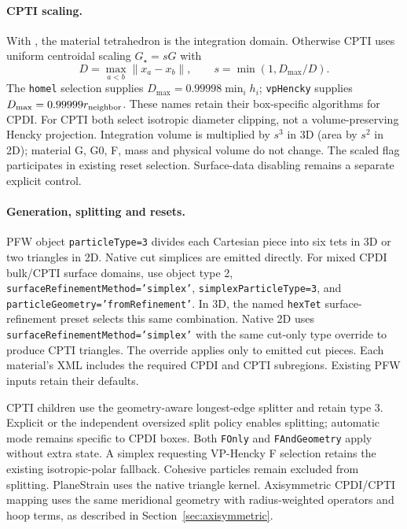 \paragraph{CPTI scaling.}
With , the material tetrahedron is the integration
domain. Otherwise CPTI uses uniform centroidal scaling $G_\star=sG$ with
\begin{equation}
 D=\max_{a<b}\|x_a-x_b\|,\qquad s=\min(1,D_{\max}/D).
\end{equation}
The \texttt{homel} selection supplies $D_{\max}=0.99998\min_i h_i$;
\texttt{vpHencky} supplies $D_{\max}=0.99999r_{\rm neighbor}$. These names
retain their box-specific algorithms for CPDI. For CPTI both select isotropic
diameter clipping, not a volume-preserving Hencky projection. Integration volume
is multiplied by $s^3$ in 3D (area by $s^2$ in 2D); material G, G0, F, mass and physical volume do not change.
The scaled flag participates in existing reset selection. Surface-data disabling
remains a separate explicit control.

\paragraph{Generation, splitting and resets.}
PFW object \texttt{particleType=3} divides each Cartesian piece into six tets
in 3D or two triangles in 2D. Native cut simplices are emitted directly. For mixed CPDI bulk/CPTI surface domains,
use object type 2, \texttt{surfaceRefinementMethod='simplex'},
\texttt{simplexParticleType=3}, and \texttt{particleGeometry='fromRefinement'}.
In 3D, the named \texttt{hexTet} surface-refinement preset selects this same combination. Native 2D uses \texttt{surfaceRefinementMethod='simplex'} with the same cut-only type override to produce CPTI triangles. The override applies only to emitted cut pieces. Each material's XML includes
the required CPDI and CPTI subregions. Existing PFW inputs retain their defaults.

CPTI children use the geometry-aware longest-edge splitter and retain type 3.
Explicit  or the independent oversized split policy
enables splitting; automatic mode remains specific to CPDI boxes. Both
\texttt{FOnly} and \texttt{FAndGeometry} apply without extra state. A simplex
requesting VP-Hencky F selection retains the existing isotropic-polar fallback.
Cohesive particles remain excluded from splitting. PlaneStrain uses the native triangle kernel. Axisymmetric CPDI/CPTI mapping uses the same meridional geometry with radius-weighted operators and hoop terms, as described in Section~\ref{sec:axisymmetric}.

